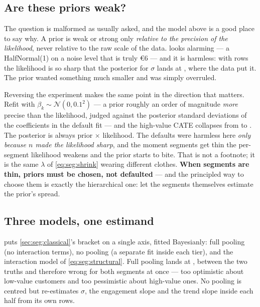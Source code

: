 \subsection*{Are these priors weak?}

The question is malformed as usually asked, and the model above is a good place to say why. A prior
is weak or strong only \emph{relative to the precision of the likelihood}, never relative to the raw
scale of the data.  looks alarming --- a HalfNormal(1) on a noise level that is
truly €6 --- and it is harmless: with \nbTwoN{} rows the likelihood is so sharp that the posterior
for $\sigma$ lands at \eur{\nbTwoSigmaPost}, where the data put it. The prior wanted something much
smaller and was simply overruled.

Reversing the experiment makes the same point in the direction that matters. Refit with
$\beta_k \sim \mathcal N(0, 0.1^2)$ --- a prior roughly an order of magnitude \emph{more} precise
than the likelihood, judged against the posterior standard deviations of the coefficients in the
default fit --- and the high-value CATE collapses from \eur{\nbTwoDefaultPriorHigh} to
\eur{\nbTwoTightPriorHigh}. The posterior is always prior $\times$ likelihood. The defaults were
harmless here \emph{only because $n$ made the likelihood sharp}, and the moment segments get thin
the per-segment likelihood weakens and the prior starts to bite. That is not a footnote; it is the
same $\lambda$ of \cref{eq:seg:shrink} wearing different clothes. \textbf{When segments are thin,
priors must be chosen, not defaulted} --- and the principled way to choose them is exactly the
hierarchical one: let the segments themselves estimate the prior's spread.

\subsection*{Three models, one estimand}

 puts \cref{sec:seg:classical}'s bracket on a single axis, fitted Bayesianly:
full pooling (no interaction terms), no pooling (a separate fit inside each tier), and the
interaction model of \cref{eq:seg:structural}. Full pooling lands at \eur{\nbTwoBayesPool}, between
the two truths and therefore wrong for both segments at once --- too optimistic about low-value
customers and too pessimistic about high-value ones. No pooling is centred but re-estimates
$\sigma$, the engagement slope and the trend slope inside each half from its own rows.

